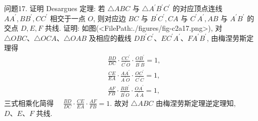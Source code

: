 问题17. 证明 Desargues 定理:
若 $\triangle A B C$ 与 $\triangle A^{\prime} B^{\prime} C^{\prime}$ 的对应顶点连线 $A A^{\prime}, B B^{\prime}, C C^{\prime}$ 相交于一点 $O$, 则对应边 $B C$ 与 $B^{\prime} C^{\prime}, C A$ 与 $C^{\prime} A^{\prime}, A B$ 与 $A^{\prime} B^{\prime}$ 的交点 $D, E, F$ 共线.
证明: 如图(<FilePath:./figures/fig-c2a17.png>), 对 $\triangle O B C 、 \triangle O C A 、 \triangle O A B$ 及相应的截线 $D B^{\prime} C^{\prime} 、 E C^{\prime} A^{\prime} 、 F A^{\prime} B^{\prime}$, 由梅涅劳斯定理得
$$
\begin{aligned}
& \frac{B D}{D C} \cdot \frac{C C^{\prime}}{C^{\prime} O} \cdot \frac{O B^{\prime}}{B^{\prime} B}=1, \\
& \frac{C E}{E A} \cdot \frac{A A^{\prime}}{A^{\prime} O} \cdot \frac{O C^{\prime}}{C^{\prime} C}=1, \\
& \frac{A F}{F B} \cdot \frac{B B^{\prime}}{B^{\prime} O} \cdot \frac{O A^{\prime}}{A^{\prime} A}=1,
\end{aligned}
$$
三式相乘化简得 $\quad \frac{B D}{D C} \cdot \frac{C E}{E A} \cdot \frac{A F}{F B}=1$.
故对 $\triangle A B C$ 由梅涅劳斯定理逆定理知, $D 、 E 、 F$ 共线.


